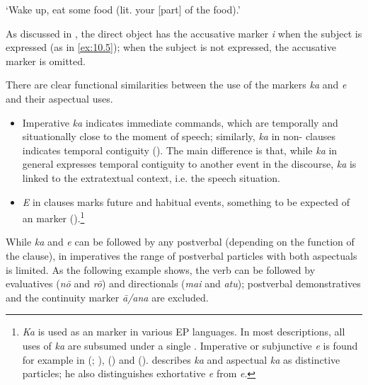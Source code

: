 \glt
‘Wake up, eat some food (lit. your [part] of the food).’ \textstyleExampleref{[R310.104]} 
\z

As discussed in , the direct object has the accusative marker \textit{i} when the subject is expressed (as in \ref{ex:10.5}); when the subject is not expressed, the accusative marker is omitted.

There are clear functional similarities between the  use of the markers \textit{ka} and \textit{e} and their aspectual uses. 

\begin{itemize}
\item 
Imperative \textit{ka} indicates immediate commands, which are temporally and situationally close to the moment of speech; similarly, \textit{ka} in non- clauses indicates temporal contiguity (). The main difference is that, while \textit{ka} in general expresses temporal contiguity to another event in the discourse,  \textit{ka} is linked to the extratextual context, i.e. the speech situation. 

\item 
\textit{E} in  clauses marks future and habitual events, something to be expected of an  marker ().\footnote{\label{fn:484}\textit{Ka} is used as an  marker in various EP languages. In most descriptions, all uses of \textit{ka} are subsumed under a single . Imperative or subjunctive \textit{e} is found for example in  (\citealt[403]{Waite1990}; \citealt[30]{Bauer1993}),  (\citealt[28]{LazardPeltzer2000}) and  (\citealt[61]{ElbertPukui1979}). \citet{WeberR2003} describes  \textit{ka} and aspectual \textit{ka} as distinctive particles; he also distinguishes exhortative \textit{e} from  \textit{e}.} 

\end{itemize}

While \textit{ka} and \textit{e} can be followed by any postverbal  (depending on the function of the clause), in imperatives the range of postverbal particles with both aspectuals is limited. As the following example shows, the verb can be followed by evaluatives (\textit{nō} and \textit{rō}) and directionals (\textit{mai} and \textit{atu}); postverbal demonstratives and the continuity marker \textit{{\ꞌ}ā/{\ꞌ}ana} are excluded.

